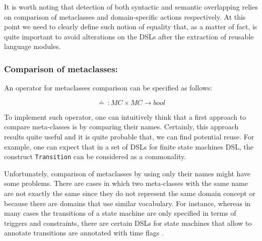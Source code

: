 


It is worth noting that detection of both syntactic and semantic overlapping relies on comparison of metaclasses and domain-specific actions respectively. At this point we need to clearly define such notion of equality that, as a matter of fact, is quite important to avoid alterations on the DSLs after the extraction of reusable language modules.

\vspace{-3mm}
\subsubsection{Comparison of metaclasses:} An operator for metaclasses comparison can be specified as follows: 

\begin{equation}
  \doteq~: MC \times MC \rightarrow bool
\end{equation}

To implement such operator, one can intuitively think that a first approach to compare meta-classes is by comparing their names. Certainly, this approach results quite useful and it is quite probable that, we can find potential reuse. For example, one can expect that in a set of DSLs for finite state machines DSL, the construct \texttt{Transition} can be considered as a commonality.

Unfortunately, comparison of metaclasses by using only their names might have some problems. There are cases in which two meta-classes with the same name are not exactly the same since they do not represent the same domain concept or because there are domains that use similar vocabulary. For instance, whereas in many cases the transitions of a state machine are only specified in terms of triggers and constraints, there are certain DSLs for state machines that allow to annotate transitions are annotated with time flags \cite{Graf:2007}.

